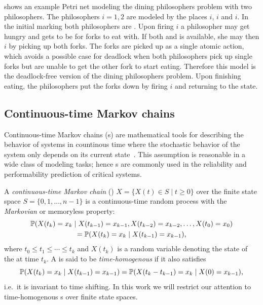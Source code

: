\begin{runningExample}\label{ex:background:pn}
   shows an example Petri net modeling the dining philosophers problem with two philosophers. The philosophers \(i = 1, 2\) are modeled by the places \(i\), \(i\) and \(i\). In the initial marking both philosophers are . Upon firing \(i\) a philosopher may get hungry and gets to be  for forks to eat with. If both  and  is available, she may then \(i\) by picking up both forks. The forks are picked up as a single atomic action, which avoids a possible case for deadlock when both philosophers pick up single forks but are unable to get the other fork to start eating. Therefore this model is the deadlock-free version of the dining philosophers problem. Upon finishing eating, the philosophers put the forks down by firing \(i\) and returning to the  state.
\end{runningExample}

\subsection{Continuous-time Markov chains}

Continuous-time Markov chains (s) are mathematical tools for describing the behavior of systems in countinous time where the stochastic behavior of the system only depends on its current state~. This assumption is reasonable in a wide class of modeling tasks; hence s are commonly used in the reliability and performability prediction of critical systems.

\begin{dfn}
  A \emph{continuous-time Markov chain} ()
  \(X = \{ X(t) \in S \mid t \ge 0 \}\) over the finite state
  space $S = \{0, 1, \ldots, n - 1\}$ is a continuous-time random
  process with the \emph{Markovian} or memoryless property:
  \begin{multline}\allowdisplaybreaks[0]
    \Pr(X(t_k) = x_k \mid X(t_{k - 1}) = x_{k - 1}, X(t_{k -
      2}) = x_{k - 2}, \ldots, X(t_{0}) = x_{0}) \\
    = \Pr(X(t_k) = x_k \mid X(t_{k - 1}) = x_{k - 1}) \text,
  \end{multline}
  where $t_0 \le t_1 \le \cdots \le t_k$ and $X(t_k)$ is a random variable denoting the state of the  at time $t_k$. A  is said to be
  \emph{time-homogenous} if it also satisfies
  \begin{equation}
    \Pr(X(t_k) = x_k \mid X(t_{k - 1}) = x_{k - 1}) = \Pr(X(t_k - t_{k -
      1}) = x_k \mid X(0) = x_{k - 1}) \text,
  \end{equation}
  i.e.~it is invariant to time shifting. In this work we will restrict our attention to time-homogenous s over finite state spaces.
\end{dfn}

